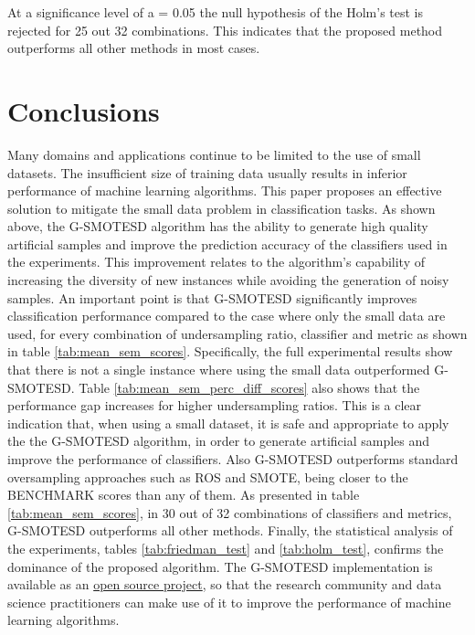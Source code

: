 \documentclass[parskip=full]{scrartcl}
\begin{document}
At a significance level of a = 0.05 the null hypothesis of the Holm's test is
rejected for 25 out 32 combinations. This indicates that the proposed method
outperforms all other methods in most cases.  

\section{Conclusions}
\label{conclusions}

Many domains and applications continue to be limited to the use of small datasets. The insufficient size of training data usually results in inferior performance of machine learning algorithms. This paper proposes an effective solution to mitigate the small data problem in classification tasks. As shown above, the G-SMOTESD algorithm has the ability to generate high quality artificial samples and improve the prediction accuracy of the classifiers used in the experiments. This improvement relates to the algorithm's capability of increasing the diversity of new instances while avoiding the generation of noisy samples. An important point is that G-SMOTESD significantly improves classification performance compared to the case where only the small data are used, for every combination of undersampling ratio, classifier and metric as shown in table \ref{tab:mean_sem_scores}. Specifically, the full experimental results show that there is not a single instance where using the small data outperformed G-SMOTESD. Table \ref{tab:mean_sem_perc_diff_scores} also shows that the performance gap increases for higher undersampling ratios. This is a clear indication that, when using a small dataset, it is safe and appropriate to apply the the G-SMOTESD algorithm, in order to generate artificial samples and improve the performance of classifiers. Also G-SMOTESD outperforms standard oversampling approaches such as ROS and SMOTE, being closer to the BENCHMARK scores than any of them. As presented in table \ref{tab:mean_sem_scores}, in 30 out of 32 combinations of classifiers and metrics, G-SMOTESD outperforms all other methods. Finally, the statistical analysis of the experiments, tables \ref{tab:friedman_test} and \ref{tab:holm_test}, confirms the dominance of the proposed algorithm. The G-SMOTESD implementation is available as an \href{https://geometric-smote.readthedocs.io/en/latest/?badge=latest}{open source project}, so that the research community and data science practitioners can make use of it to improve the performance of machine learning algorithms.



\end{document}
